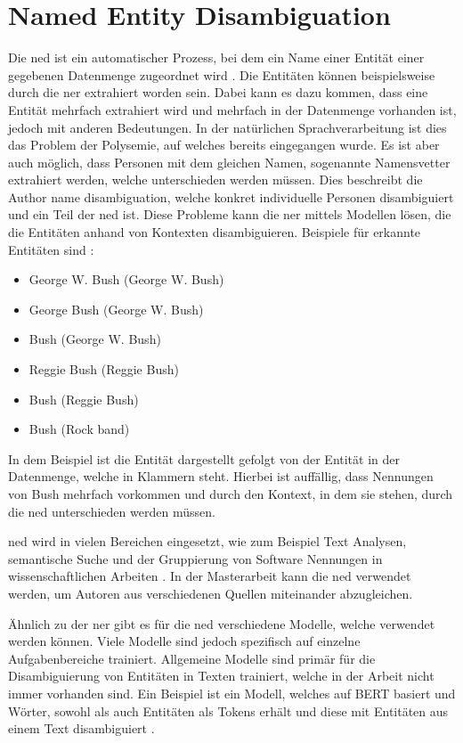\section{Named Entity Disambiguation}
\label{sec:author-name-disambiguation}
Die \gls{ned} ist ein automatischer Prozess, bei dem ein Name einer Entität einer gegebenen Datenmenge zugeordnet wird \autocites{cucerzan_large-scale_2007}{yamada_global_2022}.
Die Entitäten können beispielsweise durch die \gls{ner} extrahiert worden sein.
Dabei kann es dazu kommen, dass eine Entität mehrfach extrahiert wird und mehrfach in der Datenmenge vorhanden ist, jedoch mit anderen Bedeutungen.
In der natürlichen Sprachverarbeitung ist dies das Problem der Polysemie, auf welches bereits eingegangen wurde.
Es ist aber auch möglich, dass Personen mit dem gleichen Namen, sogenannte Namensvetter extrahiert werden, welche unterschieden werden müssen.
Dies beschreibt die Author name disambiguation, welche konkret individuelle Personen disambiguiert und ein Teil der \gls{ned} ist.
Diese Probleme kann die \gls{ner} mittels Modellen lösen, die die Entitäten anhand von Kontexten disambiguieren.
Beispiele für erkannte Entitäten sind \autocite{cucerzan_large-scale_2007}:

\begin{itemize}
  \item George W. Bush (George W. Bush)
  \item George Bush (George W. Bush)
  \item Bush (George W. Bush)
  \item Reggie Bush (Reggie Bush)
  \item Bush (Reggie Bush)
  \item Bush (Rock band)
\end{itemize}

In dem Beispiel ist die Entität dargestellt gefolgt von der Entität in der Datenmenge, welche in Klammern steht.
Hierbei ist auffällig, dass Nennungen von \glqq Bush\grqq{} mehrfach vorkommen und durch den Kontext, in dem sie stehen, durch die \gls{ned} unterschieden werden müssen.

\gls{ned} wird in vielen Bereichen eingesetzt, wie zum Beispiel Text Analysen, semantische Suche und der Gruppierung von Software Nennungen in wissenschaftlichen Arbeiten \autocites{cucerzan_large-scale_2007}{yamada_global_2022}{schindler_somesci-_2021}.
In der Masterarbeit kann die \gls{ned} verwendet werden, um Autoren aus verschiedenen Quellen miteinander abzugleichen.

Ähnlich zu der \gls{ner} gibt es für die \gls{ned} verschiedene Modelle, welche verwendet werden können.
Viele Modelle sind jedoch spezifisch auf einzelne Aufgabenbereiche trainiert.
Allgemeine Modelle sind primär für die Disambiguierung von Entitäten in Texten trainiert, welche in der Arbeit nicht immer vorhanden sind.
Ein Beispiel ist ein Modell, welches auf BERT basiert und Wörter, sowohl als auch Entitäten als Tokens erhält und diese mit Entitäten aus einem Text disambiguiert \autocite{yamada_global_2022}.

